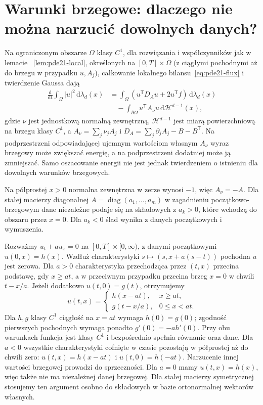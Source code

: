 \section{Warunki brzegowe: dlaczego nie można narzucić dowolnych danych?}
Na ograniczonym obszarze $\Omega$ klasy $C^1$,
dla rozwiązania i współczynników jak w lemacie
~\ref{lem:pde21-local}, określonych na
$[0,T]\times\overline\Omega$ (z ciągłymi pochodnymi
aż do brzegu w przypadku $u,A_j$), całkowanie
lokalnego bilansu~\eqref{eq:pde21-flux} i twierdzenie
Gaussa dają
\[
 \begin{split}
 \frac{\mathrm d}{\mathrm dt}\int_\Omega |u|^2\,\mathrm d\lambda_d(x)
 &=\int_\Omega(u^\mathsf TD_Au+2u^\mathsf Tf)
       \,\mathrm d\lambda_d(x)\\
 &\quad-\int_{\partial\Omega}u^\mathsf TA_\nu u
       \,\mathrm d\mathcal H^{d-1}(x),
 \end{split}
\]
gdzie $\nu$ jest jednostkową normalną zewnętrzną,
$\mathcal H^{d-1}$ jest miarą powierzchniową
na brzegu klasy $C^1$, a $A_\nu=\sum_j\nu_jA_j$ i
$D_A=\sum_j\partial_jA_j-B-B^\mathsf T$.
Na podprzestrzeni odpowiadającej ujemnym wartościom
własnym $A_\nu$ wyraz brzegowy może zwiększać energię,
a na podprzestrzeni dodatniej może ją zmniejszać.
Samo oszacowanie energii nie jest jednak twierdzeniem
o istnieniu dla dowolnych warunków brzegowych.

Na półprostej $x>0$ normalna zewnętrzna w zerze
wynosi $-1$, więc $A_\nu=-A$. Dla stałej macierzy
diagonalnej $A=\operatorname{diag}(a_1,\ldots,a_m)$
w zagadnieniu początkowo-brzegowym dane niezależne
podaje się na składowych z $a_k>0$, które wchodzą
do obszaru przez $x=0$. Dla $a_k<0$ ślad wynika
z danych początkowych i wymuszenia.

\begin{przyklad}
Rozważmy $u_t+au_x=0$ na $[0,T]\times[0,\infty)$,
z danymi początkowymi $u(0,x)=h(x)$.
Wzdłuż charakterystyki $s\mapsto(s,x+a(s-t))$
pochodna $u$ jest zerowa. Dla $a>0$ charakterystyka
przechodząca przez $(t,x)$ przecina podstawę,
gdy $x\ge at$, a w przeciwnym przypadku przecina
brzeg $x=0$ w chwili $t-x/a$.
Jeżeli dodatkowo $u(t,0)=g(t)$, otrzymujemy
\[
 u(t,x)=
 \begin{cases}
 h(x-at),&x\ge at,\\
 g(t-x/a),&0\le x<at.
 \end{cases}
\]
Dla $h,g$ klasy $C^1$ ciągłość na $x=at$ wymaga
$h(0)=g(0)$; zgodność pierwszych pochodnych wymaga
ponadto $g'(0)=-ah'(0)$.
Przy obu warunkach funkcja jest klasy $C^1$
i bezpośrednio spełnia równanie oraz dane.
Dla $a<0$ wszystkie charakterystyki cofnięte
w czasie pozostają w półprostej aż do chwili zero:
$u(t,x)=h(x-at)$ i $u(t,0)=h(-at)$.
Narzucenie innej wartości brzegowej prowadzi
do sprzeczności. Dla $a=0$ mamy $u(t,x)=h(x)$,
więc także nie ma niezależnej danej brzegowej.
Dla stałej macierzy symetrycznej stosujemy ten
argument osobno do składowych w bazie ortonormalnej
wektorów własnych.
\end{przyklad}


